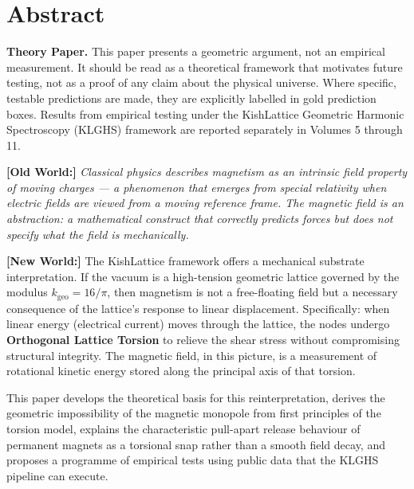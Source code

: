 \documentclass[11pt, letterpaper, openany]{book}
\newcommand{\oldworld}[1]{\noindent\textbf{\color{goldseal}[Old World:]}
  \textit{#1}\medskip}
\newcommand{\newworldcmd}[1]{\noindent\textbf{\color{kishblue}[New World:]}
  #1\medskip}
\begin{document}
\tableofcontents
\clearpage

\chapter*{Abstract}

\begin{warningbox}
\textbf{Theory Paper.} This paper presents a geometric argument, not an
empirical measurement. It should be read as a theoretical framework that
motivates future testing, not as a proof of any claim about the physical
universe. Where specific, testable predictions are made, they are explicitly
labelled in gold prediction boxes. Results from empirical testing under the
KishLattice Geometric Harmonic Spectroscopy (KLGHS) framework are reported
separately in Volumes 5 through 11.
\end{warningbox}

\bigskip

\oldworld{Classical physics describes magnetism as an intrinsic field property
of moving charges — a phenomenon that emerges from special relativity when
electric fields are viewed from a moving reference frame. The magnetic field
is an abstraction: a mathematical construct that correctly predicts forces
but does not specify what the field \emph{is} mechanically.}

\newworldcmd{The KishLattice framework offers a mechanical substrate
interpretation. If the vacuum is a high-tension geometric lattice governed
by the modulus $k_{\text{geo}} = 16/\pi$, then magnetism is not a free-floating
field but a necessary consequence of the lattice's response to linear
displacement. Specifically: when linear energy (electrical current) moves
through the lattice, the nodes undergo \textbf{Orthogonal Lattice Torsion}
to relieve the shear stress without compromising structural integrity.
The magnetic field, in this picture, is a measurement of rotational kinetic
energy stored along the principal axis of that torsion.}

This paper develops the theoretical basis for this reinterpretation, derives
the geometric impossibility of the magnetic monopole from first principles of
the torsion model, explains the characteristic pull-apart release behaviour
of permanent magnets as a torsional snap rather than a smooth field decay,
and proposes a programme of empirical tests using public data that the KLGHS
pipeline can execute.
\end{document}

